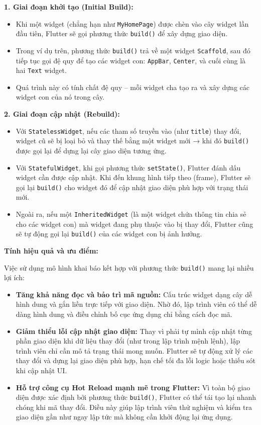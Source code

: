 \documentclass[../DoAn.tex]{subfiles}
\numberwithin{figure}{chapter}
\begin{document}
\textbf{1. Giai đoạn khởi tạo (Initial Build):}
\begin{itemize}
\item Khi một widget (chẳng hạn như \texttt{MyHomePage}) được chèn vào cây widget lần đầu tiên, Flutter sẽ gọi phương thức \texttt{build()} để xây dựng giao diện.
\item Trong ví dụ trên, phương thức \texttt{build()} trả về một widget \texttt{Scaffold}, sau đó tiếp tục gọi đệ quy để tạo các widget con: \texttt{AppBar}, \texttt{Center}, và cuối cùng là hai \texttt{Text} widget.
\item Quá trình này có tính chất đệ quy – mỗi widget cha tạo ra và xây dựng các widget con của nó trong cây.
\end{itemize}

\textbf{2. Giai đoạn cập nhật (Rebuild):}
\begin{itemize}
\item Với \texttt{StatelessWidget}, nếu các tham số truyền vào (như \texttt{title}) thay đổi, widget cũ sẽ bị loại bỏ và thay thế bằng một widget mới → khi đó \texttt{build()} được gọi lại để dựng lại cây giao diện tương ứng.
\item Với \texttt{StatefulWidget}, khi gọi phương thức \texttt{setState()}, Flutter đánh dấu widget cần được cập nhật. Khi đến khung hình tiếp theo (frame), Flutter sẽ gọi lại \texttt{build()} cho widget đó để cập nhật giao diện phù hợp với trạng thái mới.
\item Ngoài ra, nếu một \texttt{InheritedWidget} (là một widget chứa thông tin chia sẻ cho các widget con) mà widget đang phụ thuộc vào bị thay đổi, Flutter cũng sẽ tự động gọi lại \texttt{build()} của các widget con bị ảnh hưởng.
\end{itemize}

\textbf{Tính hiệu quả và ưu điểm:}

Việc sử dụng mô hình khai báo kết hợp với phương thức \texttt{build()} mang lại nhiều lợi ích:
\begin{itemize}
\item \textbf{Tăng khả năng đọc và bảo trì mã nguồn:} Cấu trúc widget dạng cây dễ hình dung và gắn liền trực tiếp với giao diện. Nhờ đó, lập trình viên có thể dễ dàng hình dung và điều chỉnh bố cục ứng dụng chỉ bằng cách đọc mã.
\item \textbf{Giảm thiểu lỗi cập nhật giao diện:} Thay vì phải tự mình cập nhật từng phần giao diện khi dữ liệu thay đổi (như trong lập trình mệnh lệnh), lập trình viên chỉ cần mô tả trạng thái mong muốn. Flutter sẽ tự động xử lý các thay đổi và dựng lại giao diện phù hợp, hạn chế tối đa lỗi logic hoặc thiếu sót khi cập nhật UI.
\item \textbf{Hỗ trợ công cụ Hot Reload mạnh mẽ trong Flutter:} Vì toàn bộ giao diện được xác định bởi phương thức \texttt{build()}, Flutter có thể tái tạo lại nhanh chóng khi mã thay đổi. Điều này giúp lập trình viên thử nghiệm và kiểm tra giao diện gần như ngay lập tức mà không cần khởi động lại ứng dụng.
\end{itemize}
\end{document}
